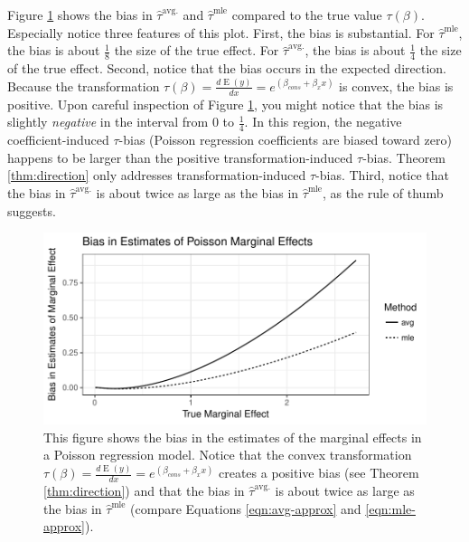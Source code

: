 \documentclass[10pt]{article}
\DeclareMathOperator*{\E}{\text{E}}
\begin{document}
Figure \ref{fig:poisson-mcs} shows the bias in $\hat{\tau}^\text{avg.}$ and $\hat{\tau}^\text{mle}$ compared to the true value $\tau(\beta)$. 
Especially notice three features of this plot. 
First, the bias is substantial. 
For $\hat{\tau}^\text{mle}$, the bias is about $\frac{1}{8}$ the size of the true effect. 
For $\hat{\tau}^\text{avg.}$, the bias is about $\frac{1}{4}$ the size of the true effect. 
Second, notice that the bias occurs in the expected direction. 
Because the transformation $\tau(\beta) = \frac{d \E (y)}{dx} = e^{(\beta_{cons} + \beta_x x)}$ is convex, the bias is positive. 
Upon careful inspection of Figure \ref{fig:poisson-mcs}, you might notice that the bias is slightly \textit{negative} in the interval from 0 to $\frac{1}{4}$. 
In this region, the negative coefficient-induced $\tau$-bias (Poisson regression coefficients are biased toward zero) happens to be larger than the positive transformation-induced $\tau$-bias. Theorem \ref{thm:direction} only addresses transformation-induced $\tau$-bias.
Third, notice that the bias in $\hat{\tau}^\text{avg.}$ is about twice as large as the bias in $\hat{\tau}^\text{mle}$, as the rule of thumb suggests.

\begin{figure}[h!]
\begin{center}
\includegraphics[scale = 0.6]{figs/poisson-mcs.pdf}
\caption{This figure shows the bias in the estimates of the marginal effects in a Poisson regression model. Notice that the convex transformation $\tau(\beta) = \frac{d \E (y)}{dx} = e^{(\beta_{cons} + \beta_x x)}$ creates a positive bias (see Theorem \ref{thm:direction}) and that the bias in $\hat{\tau}^\text{avg.}$ is about twice as large as the bias in $\hat{\tau}^\text{mle}$ (compare Equations \ref{eqn:avg-approx} and \ref{eqn:mle-approx}).}\label{fig:poisson-mcs}
\end{center}
\end{figure}
\end{document}
